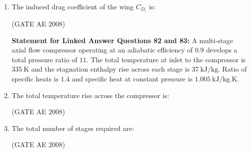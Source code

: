 \documentclass[journal,12pt,onecolumn]{IEEEtran}
\theoremstyle{remark}
\begin{document}
\begin{enumerate}
\quad 

\item The induced drag coefficient of the wing $C_{D_i}$ is:  

\begin{enumerate}
\end{enumerate}
\hfill(GATE AE 2008)

\quad 

\textbf{Statement for Linked Answer Questions 82 and 83:}  
A multi-stage axial flow compressor operating at an adiabatic efficiency of $0.9$ develops a total pressure ratio of $11$.  
The total temperature at inlet to the compressor is $335 \ \text{K}$ and the stagnation enthalpy rise across each stage is $37 \ \text{kJ/kg}$.  
Ratio of specific heats is $1.4$ and specific heat at constant pressure is $1.005 \ \text{kJ/kg.K}$.

\item The total temperature rise across the compressor is:  

\begin{enumerate}
\end{enumerate}
\hfill(GATE AE 2008)

\quad

\item The total number of stages required are:  

\begin{enumerate}
\end{enumerate} 
\hfill(GATE AE 2008)

\quad


\end{enumerate}
\end{document}
